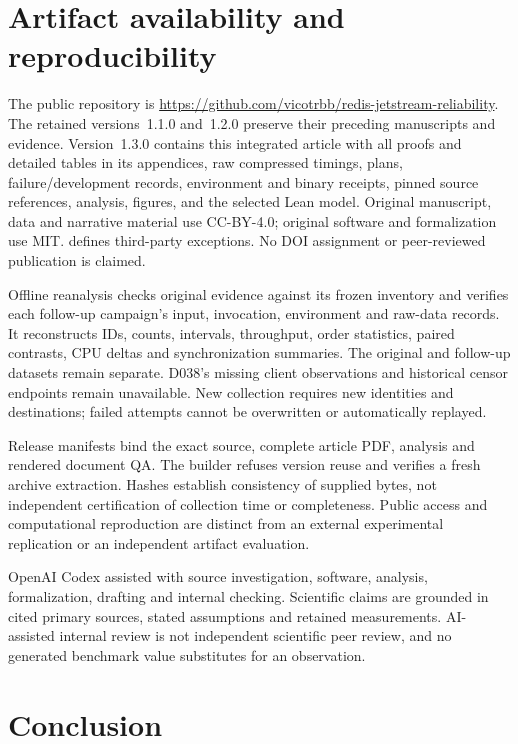 \documentclass[11pt]{article}
\theoremstyle{definition}
\newcommand{\artifact}[1]{\texttt{\path{#1}}}
\begin{document}
\section{Artifact availability and reproducibility}\label{sec:artifact}

The public repository is \url{https://github.com/vicotrbb/redis-jetstream-reliability}. The retained versions~1.1.0 and~1.2.0 preserve their preceding manuscripts and evidence. Version~1.3.0 contains this integrated article with all proofs and detailed tables in its appendices, raw compressed timings, plans, failure/development records, environment and binary receipts, pinned source references, analysis, figures, and the selected Lean model. Original manuscript, data and narrative material use CC-BY-4.0; original software and formalization use MIT. \artifact{LICENSE.md} defines third-party exceptions. No DOI assignment or peer-reviewed publication is claimed.

Offline reanalysis checks original evidence against its frozen inventory and verifies each follow-up campaign's input, invocation, environment and raw-data records. It reconstructs IDs, counts, intervals, throughput, order statistics, paired contrasts, CPU deltas and synchronization summaries. The original and follow-up datasets remain separate. D038's missing client observations and historical censor endpoints remain unavailable. New collection requires new identities and destinations; failed attempts cannot be overwritten or automatically replayed.

Release manifests bind the exact source, complete article PDF, analysis and rendered document QA. The builder refuses version reuse and verifies a fresh archive extraction. Hashes establish consistency of supplied bytes, not independent certification of collection time or completeness. Public access and computational reproduction are distinct from an external experimental replication or an independent artifact evaluation.

OpenAI Codex assisted with source investigation, software, analysis, formalization, drafting and internal checking. Scientific claims are grounded in cited primary sources, stated assumptions and retained measurements. AI-assisted internal review is not independent scientific peer review, and no generated benchmark value substitutes for an observation.

\section{Conclusion}\label{sec:conclusion}

\end{document}
